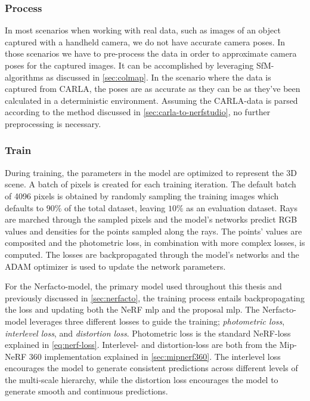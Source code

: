 \subsubsection{Process}

In most scenarios when working with real data, such as images of an object captured with a handheld camera, we do not have accurate camera poses. In those scenarios we have to pre-process the data in order to approximate camera poses for the captured images. It can be accomplished by leveraging SfM-algorithms as discussed in \autoref{sec:colmap}. In the scenario where the data is captured from CARLA, the poses are as accurate as they can be as they've been calculated in a deterministic environment. Assuming the CARLA-data is parsed according to the method discussed in \autoref{sec:carla-to-nerfstudio}, no further preprocessing is necessary.

\subsubsection{Train}
During training, the parameters in the model are optimized to represent the 3D scene. A batch of pixels is created for each training iteration. The default batch of 4096 pixels is obtained by randomly sampling the training images which defaults to $90\%$ of the total dataset, leaving $10\%$ as an evaluation dataset. Rays are marched through the sampled pixels and the model's networks predict RGB values and densities for the points sampled along the rays. The points' values are composited and the photometric loss, in combination with more complex losses, is computed. The losses are backpropagated through the model's networks and the ADAM optimizer\cite{adam} is used to update the network parameters.

For the Nerfacto-model, the primary model used throughout this thesis and previously discussed in \autoref{sec:nerfacto}, the training process entails backpropagating the loss and updating both the NeRF \acrshort{mlp} and the proposal \acrshort{mlp}. The Nerfacto-model leverages three different losses to guide the training; \textit{photometric loss}, \textit{interlevel loss}, and \textit{distortion loss}. Photometric loss is the standard NeRF-loss explained in \autoref{eq:nerf-loss}. Interlevel- and distortion-loss are both from the Mip-NeRF 360\cite{barron_mip-nerf_2022} implementation explained in \autoref{sec:mipnerf360}. The interlevel loss encourages the model to generate consistent predictions across different levels of the multi-scale hierarchy, while the distortion loss encourages the model to generate smooth and continuous predictions.

